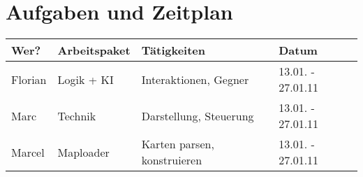 \documentclass[11pt,a4paper,notitlepage]{report}
\begin{document}
	\newpage
	\section*{Aufgaben und Zeitplan}

	\begin{tabular}{ p{3.5cm} | p{3.5cm} | p{5.0cm} | p{3.0cm} }
		Wer? & Arbeitspaket & Tätigkeiten & Datum \\
		\hline
		Florian & Logik + KI & Interaktionen, Gegner & 13.01. - 27.01.11 \\
		Marc & Technik & Darstellung, Steuerung & 13.01. - 27.01.11 \\
		Marcel & Maploader & Karten parsen, konstruieren & 13.01. - 27.01.11
	\end{tabular}
\end{document}
